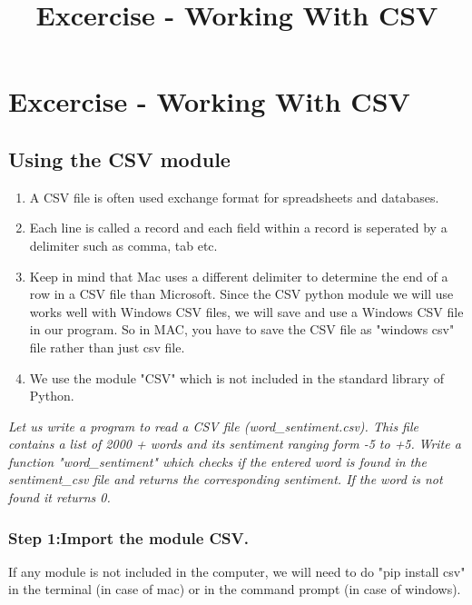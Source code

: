 \documentclass[11pt]{article}
\title{Excercise - Working With CSV}
\providecommand{\tightlist}{%
      \setlength{\itemsep}{0pt}\setlength{\parskip}{0pt}}
\begin{document}
    
    
    \maketitle
    
    

    
    \section{Excercise - Working With
CSV}\label{excercise---working-with-csv}

    \subsection{Using the CSV module}\label{using-the-csv-module}

\begin{enumerate}
\def\labelenumi{\arabic{enumi}.}
\tightlist
\item
  A CSV file is often used exchange format for spreadsheets and
  databases.
\item
  Each line is called a record and each field within a record is
  seperated by a delimiter such as comma, tab etc.
\item
  Keep in mind that Mac uses a different delimiter to determine the end
  of a row in a CSV file than Microsoft. Since the CSV python module we
  will use works well with Windows CSV files, we will save and use a
  Windows CSV file in our program. So in MAC, you have to save the CSV
  file as "windows csv" file rather than just csv file.
\item
  We use the module "CSV" which is not included in the standard library
  of Python.
\end{enumerate}

    \emph{Let us write a program to read a CSV file (word\_sentiment.csv).
This file contains a list of 2000 + words and its sentiment ranging form
-5 to +5.} \emph{Write a function "word\_sentiment" which checks if the
entered word is found in the sentiment\_csv file and returns the
corresponding sentiment. If the word is not found it returns 0.}

    \subsubsection{Step 1:Import the module
CSV.}\label{step-1import-the-module-csv.}

If any module is not included in the computer, we will need to do "pip
install csv" in the terminal (in case of mac) or in the command prompt
(in case of windows).
\end{document}
